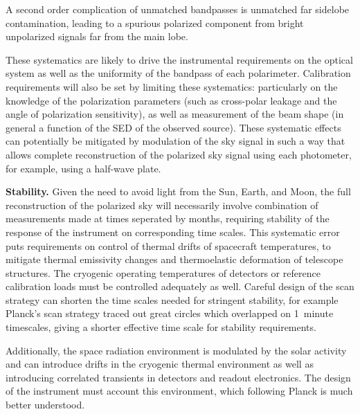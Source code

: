A second order complication of unmatched bandpasses is unmatched far sidelobe contamination, leading to a spurious polarized component from bright unpolarized signals far from the main lobe.


These systematics are likely to drive the instrumental
requirements on the optical system as well as the uniformity of the
bandpass of each polarimeter.  Calibration requirements will also be
set by limiting these systematics: particularly on the
knowledge of the polarization parameters (such as cross-polar leakage
and the angle of polarization sensitivity), as well as measurement of
the beam shape (in general a function of the SED of the observed source).
These systematic effects can potentially be mitigated by modulation of the sky signal in
such a way that allows complete reconstruction of the 
polarized sky signal using each photometer, for example, using a
half-wave plate.  

\textbf{Stability.}  Given the need to avoid light from the Sun,
Earth, and Moon, the full reconstruction of the polarized sky will
necessarily involve combination of measurements made at times
seperated by months, requiring stability of the response of the
instrument on corresponding time scales.  This systematic error puts
requirements on control of thermal drifts of spacecraft temperatures, to
mitigate thermal emissivity changes and thermoelastic deformation of
telescope structures.  The cryogenic operating
temperatures of detectors or reference calibration loads must be controlled
adequately as well.
Careful design of the scan strategy can shorten the time
scales needed for stringent stability, for example
Planck's scan strategy traced out great circles which overlapped on
1~minute timescales, giving a shorter effective time scale for
stability 
requirements. 

Additionally, the space radiation environment is modulated by the solar activity and
can introduce drifts in the cryogenic thermal environment as well as
introducing correlated transients in detectors and readout
electronics.  The design of the instrument must account this
environment, which following Planck is much better understood.

